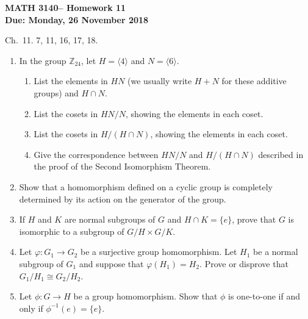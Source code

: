 \documentclass[12pt,reqno]{amsart}
\newcommand{\<}{\ensuremath{\langle}}
\renewcommand{\>}{\ensuremath{\rangle}}
\newcommand{\subject}{MATH\xspace}
\newcommand{\coursenumber}{3140\xspace}
\newcommand{\exercises}{Ch.~11. 7, 11, 16, 17, 18.}
\newcommand{\due}[1]{{\bf Due:} #1}
\newcommand{\hwheading}{\textbf{\subject \coursenumber -- Homework 11 \\ \due{Monday, 26 November 2018}}}
\begin{document}
\thispagestyle{empty}

\noindent \hwheading

 \exercises 

\bigskip

\begin{enumerate}
\item[{\bf 11.7}] 
In the group ${\mathbb Z}_{24}$, let $H = \langle 4 \rangle$ and $N =
\langle 6 \rangle$. 
\begin{enumerate}
 
 \item
List the elements in $HN$ (we usually write $H + N$ for these additive
groups) and $H \cap N$. 
 
 \item
List the cosets in $HN/N$, showing the elements in each coset.
 
 \item
List the cosets in $H/(H \cap N)$, showing the elements in each coset. 
 
 \item
Give the correspondence between $HN/N$ and $H/(H \cap N)$ described in
the proof of the Second Isomorphism Theorem. 
\end{enumerate}


\bigskip

\item[{\bf 11.11}]
Show that a homomorphism defined on a cyclic group is completely
determined by its action on the generator of the group.

\bigskip

\item[{\bf 11.16}]
If $H$ and $K$ are normal subgroups of $G$ and $H \cap K = \{ e \}$,
prove that $G$ is isomorphic to a subgroup of $G/H \times G/K$.

\bigskip

\newcommand\GHGK{\ensuremath{G/H \times G/K}}
\item[{\bf 11.17}]
Let $\varphi : G_1 \rightarrow G_2$ be a surjective group homomorphism.
Let $H_1$ be a normal subgroup of $G_1$ and suppose that $\varphi(H_1) =
H_2$.  Prove or disprove that $G_1/H_1 \cong G_2/H_2$.
 
\bigskip

\item[{\bf 11.18}]
Let $\phi : G \rightarrow H$ be a group homomorphism.  Show that
$\phi$ is one-to-one if and only if $\phi^{-1}(e) = \{ e \}$.

\end{enumerate}
\end{document}

